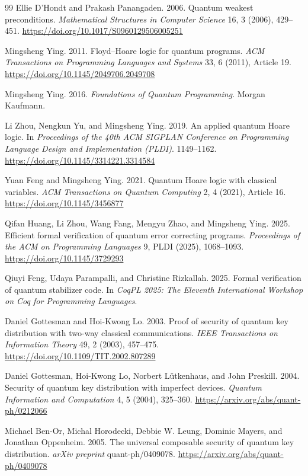 \documentclass[conference,compsoc]{IEEEtran}
\begin{document}
\begin{thebibliography}{99}
Ellie D'Hondt and Prakash Panangaden.
2006.
Quantum weakest preconditions.
\emph{Mathematical Structures in Computer Science} 16, 3 (2006), 429--451.
\url{https://doi.org/10.1017/S0960129506005251}

Mingsheng Ying.
2011.
Floyd--Hoare logic for quantum programs.
\emph{ACM Transactions on Programming Languages and Systems} 33, 6 (2011), Article 19.
\url{https://doi.org/10.1145/2049706.2049708}

Mingsheng Ying.
2016.
\emph{Foundations of Quantum Programming}.
Morgan Kaufmann.

Li Zhou, Nengkun Yu, and Mingsheng Ying.
2019.
An applied quantum Hoare logic.
In \emph{Proceedings of the 40th ACM SIGPLAN Conference on Programming Language Design and Implementation (PLDI)}. 1149--1162.
\url{https://doi.org/10.1145/3314221.3314584}

Yuan Feng and Mingsheng Ying.
2021.
Quantum Hoare logic with classical variables.
\emph{ACM Transactions on Quantum Computing} 2, 4 (2021), Article 16.
\url{https://doi.org/10.1145/3456877}

Qifan Huang, Li Zhou, Wang Fang, Mengyu Zhao, and Mingsheng Ying.
2025.
Efficient formal verification of quantum error correcting programs.
\emph{Proceedings of the ACM on Programming Languages} 9, PLDI (2025), 1068--1093.
\url{https://doi.org/10.1145/3729293}

Qiuyi Feng, Udaya Parampalli, and Christine Rizkallah.
2025.
Formal verification of quantum stabilizer code.
In \emph{CoqPL 2025: The Eleventh International Workshop on Coq for Programming Languages}.

Daniel Gottesman and Hoi-Kwong Lo.
2003.
Proof of security of quantum key distribution with two-way classical communications.
\emph{IEEE Transactions on Information Theory} 49, 2 (2003), 457--475.
\url{https://doi.org/10.1109/TIT.2002.807289}

Daniel Gottesman, Hoi-Kwong Lo, Norbert L\"utkenhaus, and John Preskill.
2004.
Security of quantum key distribution with imperfect devices.
\emph{Quantum Information and Computation} 4, 5 (2004), 325--360.
\url{https://arxiv.org/abs/quant-ph/0212066}

Michael Ben-Or, Michal Horodecki, Debbie W. Leung, Dominic Mayers, and Jonathan Oppenheim.
2005.
The universal composable security of quantum key distribution.
\emph{arXiv preprint} quant-ph/0409078.
\url{https://arxiv.org/abs/quant-ph/0409078}


\end{thebibliography}
\end{document}
